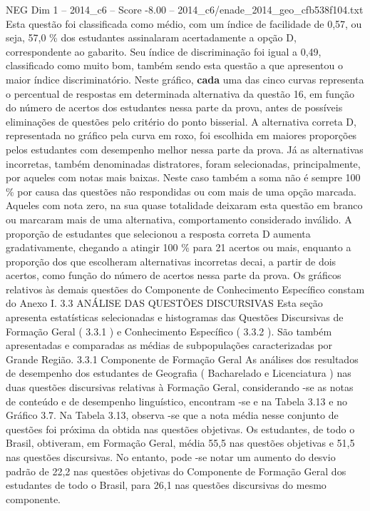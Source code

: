 \begin{textsample}{NEG Dim 1 – 2014\_c6 – Score -8.00 – 2014\_c6/enade\_2014\_geo\_cfb538f104.txt}
Esta questão foi classificada como médio, com um índice de facilidade de 0,57, ou seja, 57,0 \% dos estudantes assinalaram acertadamente a opção D, correspondente ao gabarito.
Seu índice de discriminação foi igual a 0,49, classificado como muito bom, também sendo esta questão a que apresentou o maior índice discriminatório.
Neste gráfico, \textbf{cada} uma das cinco curvas representa o percentual de respostas em determinada alternativa da questão 16, em função do número de acertos dos estudantes nessa parte da prova, antes de possíveis eliminações de questões pelo critério do ponto bisserial.
A alternativa correta D, representada no gráfico pela curva em roxo, foi escolhida em maiores proporções pelos estudantes com desempenho melhor nessa parte da prova.
Já as alternativas incorretas, também denominadas distratores, foram selecionadas, principalmente, por aqueles com notas mais baixas.
Neste caso também a soma não é sempre 100 \% por causa das questões não respondidas ou com mais de uma opção marcada.
Aqueles com nota zero, na sua quase totalidade deixaram esta questão em branco ou marcaram mais de uma alternativa, comportamento considerado inválido.
A proporção de estudantes que selecionou a resposta correta D aumenta gradativamente, chegando a atingir 100 \% para 21 acertos ou mais, enquanto a proporção dos que escolheram alternativas incorretas decai, a partir de dois acertos, como função do número de acertos nessa parte da prova.
Os gráficos relativos às demais questões do Componente de Conhecimento Específico constam do Anexo I. 3.3 ANÁLISE DAS QUESTÕES DISCURSIVAS Esta seção apresenta estatísticas selecionadas e histogramas das Questões Discursivas de Formação Geral ( 3.3.1 ) e Conhecimento Específico ( 3.3.2 ).
São também apresentadas e comparadas as médias de subpopulações caracterizadas por Grande Região. 3.3.1 Componente de Formação Geral As análises dos resultados de desempenho dos estudantes de Geografia ( Bacharelado e Licenciatura ) nas duas questões discursivas relativas à Formação Geral, considerando -se as notas de conteúdo e de desempenho linguístico, encontram -se e na Tabela 3.13 e no Gráfico 3.7.
Na Tabela 3.13, observa -se que a nota média nesse conjunto de questões foi próxima da obtida nas questões objetivas.
Os estudantes, de todo o Brasil, obtiveram, em Formação Geral, média 55,5 nas questões objetivas e 51,5 nas questões discursivas.
No entanto, pode -se notar um aumento do desvio padrão de 22,2 nas questões objetivas do Componente de Formação Geral dos estudantes de todo o Brasil, para 26,1 nas questões discursivas do mesmo componente.

\end{textsample}
